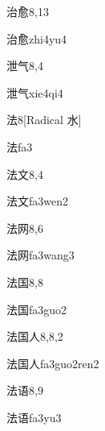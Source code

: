 \begin{entry}{治愈}{8,13}
  \begin{phonetics}{治愈}{zhi4yu4}
  \end{phonetics}
\end{entry}

\begin{entry}{泄气}{8,4}
  \begin{phonetics}{泄气}{xie4qi4}
  \end{phonetics}
\end{entry}

\begin{entry}{法}{8}[Radical 水]
  \begin{phonetics}{法}{fa3}
  \end{phonetics}
\end{entry}

\begin{entry}{法文}{8,4}
  \begin{phonetics}{法文}{fa3wen2}
  \end{phonetics}
\end{entry}

\begin{entry}{法网}{8,6}
  \begin{phonetics}{法网}{fa3wang3}
  \end{phonetics}
\end{entry}

\begin{entry}{法国}{8,8}
  \begin{phonetics}{法国}{fa3guo2}
  \end{phonetics}
\end{entry}

\begin{entry}{法国人}{8,8,2}
  \begin{phonetics}{法国人}{fa3guo2ren2}
  \end{phonetics}
\end{entry}

\begin{entry}{法语}{8,9}
  \begin{phonetics}{法语}{fa3yu3}
  \end{phonetics}
\end{entry}

